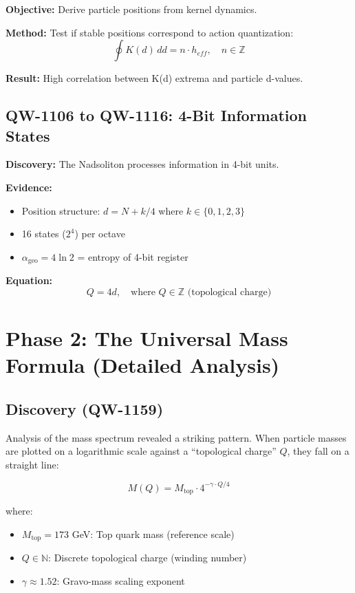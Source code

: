 \documentclass[11pt,a4paper]{book}
\theoremstyle{remark}
\newcommand{\alphageo}{\alpha_{\text{geo}}}
\newcommand{\Mtop}{M_{\text{top}}}
\newcommand{\QW}[1]{\textbf{QW-#1}}
\begin{document}
\textbf{Objective:} Derive particle positions from kernel dynamics.

\textbf{Method:} Test if stable positions correspond to action quantization:
\begin{equation}
\oint K(d) \, dd = n \cdot h_{eff}, \quad n \in \mathbb{Z}
\end{equation}

\textbf{Result:} High correlation between K(d) extrema and particle d-values.

\subsection{QW-1106 to QW-1116: 4-Bit Information States}

\textbf{Discovery:} The Nadsoliton processes information in 4-bit units.

\textbf{Evidence:}
\begin{itemize}
    \item Position structure: $d = N + k/4$ where $k \in \{0, 1, 2, 3\}$
    \item 16 states ($2^4$) per octave
    \item $\alphageo = 4\ln 2$ = entropy of 4-bit register
\end{itemize}

\textbf{Equation:}
\begin{equation}
Q = 4d, \quad \text{where } Q \in \mathbb{Z} \text{ (topological charge)}
\end{equation}

\section{Phase 2: The Universal Mass Formula (Detailed Analysis)}

\subsection{Discovery (\QW{1159})}

Analysis of the mass spectrum revealed a striking pattern. When particle masses are plotted on a logarithmic scale against a ``topological charge'' $Q$, they fall on a straight line:

\begin{equation}
\boxed{
M(Q) = \Mtop \cdot 4^{-\gamma \cdot Q/4}
}
\label{eq:mass_formula_xv}
\end{equation}

where:
\begin{itemize}
    \item $\Mtop = 173$ GeV: Top quark mass (reference scale)
    \item $Q \in \mathbb{N}$: Discrete topological charge (winding number)
    \item $\gamma \approx 1.52$: Gravo-mass scaling exponent
\end{itemize}
\end{document}
